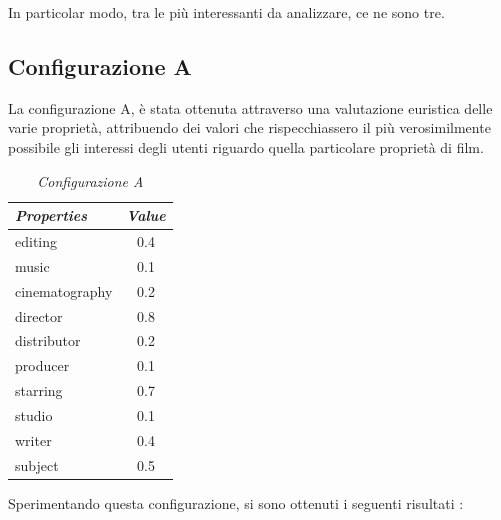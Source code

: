In particolar modo, tra le più interessanti da analizzare, ce ne sono tre.
\subsection{Configurazione A}
La configurazione A, è stata ottenuta attraverso una valutazione euristica delle varie proprietà, attribuendo dei valori che rispecchiassero il più verosimilmente possibile gli interessi degli utenti riguardo quella particolare proprietà di film.
\begin{table}[H]
\small
\centering
\begin{tabular}{l c}
\textit{Properties} & \textit{Value} \\\hline
editing & 0.4 \\
music & 0.1 \\
cinematography & 0.2 \\
director & 0.8 \\
distributor & 0.2 \\
producer & 0.1 \\
starring & 0.7 \\
studio & 0.1 \\
writer & 0.4 \\
subject & 0.5 \\
\end{tabular}
\caption{\emph{Configurazione A}}
\end{table}
Sperimentando questa configurazione, si sono ottenuti i seguenti risultati : 


\setlength{\tabcolsep}{12pt}


